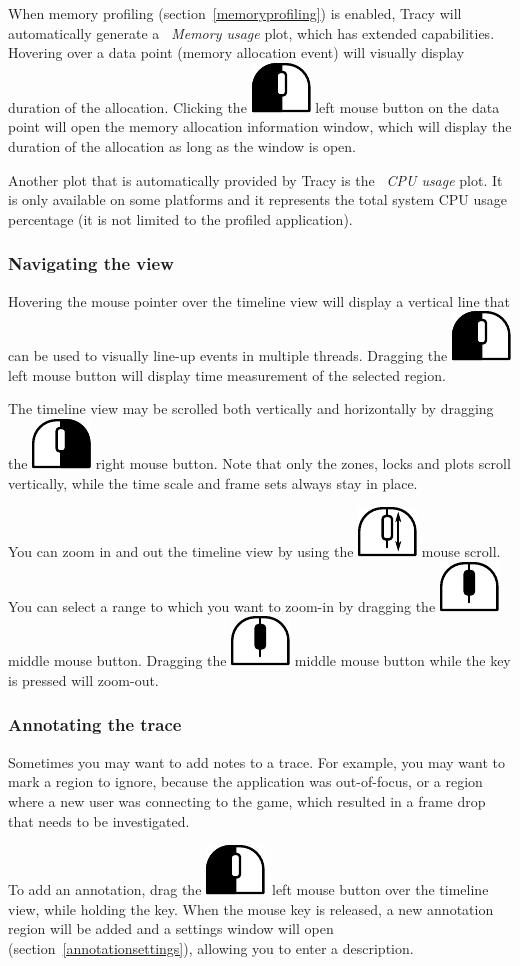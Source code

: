 \documentclass[hidelinks,titlepage,a4paper]{article}
\newcommand{\LMB}{\includegraphics[height=.8\baselineskip]{icons/lmb}}
\newcommand{\RMB}{\includegraphics[height=.8\baselineskip]{icons/rmb}}
\newcommand{\MMB}{\includegraphics[height=.8\baselineskip]{icons/mmb}}
\newcommand{\Scroll}{\includegraphics[height=.8\baselineskip]{icons/scroll}}
\begin{document}
When memory profiling (section~\ref{memoryprofiling}) is enabled, Tracy will automatically generate a \emph{\faMemory{}~Memory usage} plot, which has extended capabilities. Hovering over a data point (memory allocation event) will visually display duration of the allocation. Clicking the \LMB{} left mouse button on the data point will open the memory allocation information window, which will display the duration of the allocation as long as the window is open.

Another plot that is automatically provided by Tracy is the \emph{\faTachometer*{}~CPU usage} plot. It is only available on some platforms and it represents the total system CPU usage percentage (it is not limited to the profiled application).

\subsubsection{Navigating the view}

Hovering the \faMousePointer{} mouse pointer over the timeline view will display a vertical line that can be used to visually line-up events in multiple threads. Dragging the \LMB{} left mouse button will display time measurement of the selected region.

The timeline view may be scrolled both vertically and horizontally by dragging the \RMB{} right mouse button. Note that only the zones, locks and plots scroll vertically, while the time scale and frame sets always stay in place.

You can zoom in and out the timeline view by using the \Scroll{} mouse scroll. You can select a range to which you want to zoom-in by dragging the \MMB{} middle mouse button. Dragging the \MMB{} middle mouse button while the \keys{\ctrl} key is pressed will zoom-out.

\subsubsection{Annotating the trace}
\label{annotatingtrace}

Sometimes you may want to add notes to a trace. For example, you may want to mark a region to ignore, because the application was out-of-focus, or a region where a new user was connecting to the game, which resulted in a frame drop that needs to be investigated.

To add an annotation, drag the \LMB{}~left mouse button over the timeline view, while holding the \keys{\ctrl} key. When the mouse key is released, a new annotation region will be added and a settings window will open (section~\ref{annotationsettings}), allowing you to enter a description.
\end{document}
